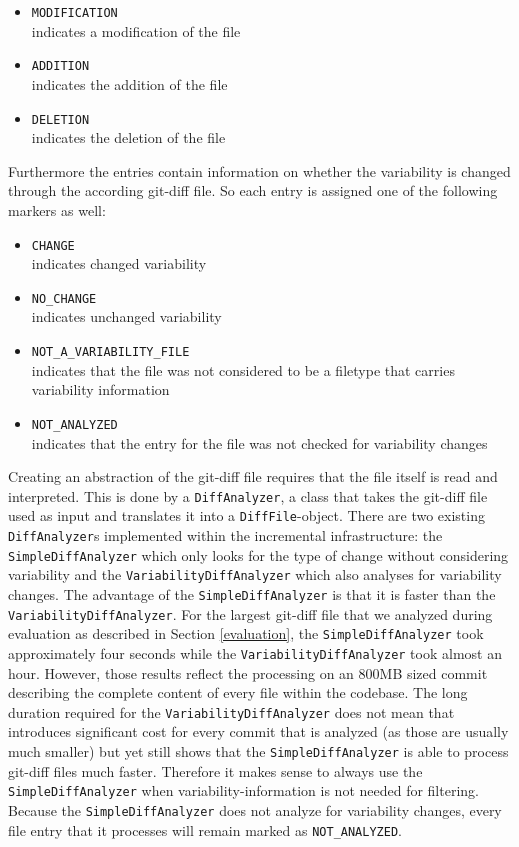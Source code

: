 \documentclass[a4paper]{article}
\begin{document}
\begin{itemize}
	\item \texttt{MODIFICATION} \\
	      indicates a modification of the file
	\item \texttt{ADDITION} \\
	      indicates the addition of the file
	\item \texttt{DELETION} \\
	      indicates the deletion of the file
\end{itemize}

Furthermore the entries contain information on whether the variability is changed through the according git-diff file. So each entry is assigned one of the following markers as well:

\begin{itemize}
	\item \texttt{CHANGE} \\
	      indicates changed variability
	\item \texttt{NO\_CHANGE} \\
	      indicates unchanged variability
	\item \texttt{NOT\_A\_VARIABILITY\_FILE}\\
	      indicates that the file was not considered to be a filetype that carries variability information
	\item \texttt{NOT\_ANALYZED}\\
	      indicates that the entry for the file was not checked for variability changes
\end{itemize}

Creating an abstraction of the git-diff file requires that the file itself is read and interpreted. This is done by a \texttt{DiffAnalyzer}, a class that takes the git-diff file used as input and translates it into a \texttt{DiffFile}-object. There are two existing \texttt{DiffAnalyzer}s implemented within the incremental infrastructure: the \texttt{Simple\-Diff\-Analyzer} which only looks for the type of change without considering variability and the \texttt{Variability\-Diff\-Analyzer} which also analyses for variability changes. The advantage of the \texttt{Simple\-Diff\-Analyzer} is that it is faster than the \texttt{Variability\-Diff\-Analyzer}. For the largest git-diff file that we analyzed during evaluation as described in Section \ref{evaluation}, the \texttt{Simple\-Diff\-Analyzer} took approximately four seconds while the \texttt{Variability\-Diff\-Analyzer} took almost an hour. However, those results reflect the processing on an 800MB sized commit describing the complete content of every file within the codebase. The long duration required for the \texttt{Variability\-Diff\-Analyzer} does not mean that introduces significant cost for every commit that is analyzed (as those are usually much smaller) but yet still shows that the \texttt{Simple\-Diff\-Analyzer} is able to process git-diff files much faster.
Therefore it makes sense to always use the \texttt{Simple\-Diff\-Analyzer} when variability-information is not needed for filtering. Because the \texttt{Simple\-Diff\-Analyzer} does not analyze for variability changes, every file entry that it processes will remain marked as \texttt{NOT\_ANALYZED}.
\end{document}
